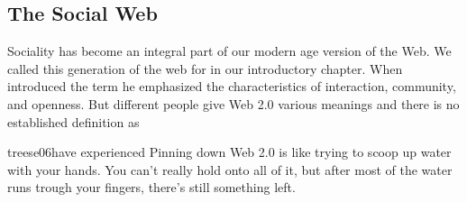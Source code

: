 \subsection{The Social Web}
\label{section:background.sociality.the.social.web}

Sociality has become an integral part of our modern age version of the Web.
We called this generation of the web for %
in our introductory chapter. When \citet{oreilly05} introduced the term he
emphasized the characteristics of interaction, community, and openness.
But different people give Web 2.0 various meanings and there is no
established definition as
\begin{fullquote}[p.~15]{treese06}{have experienced}
  Pinning down Web 2.0 is like trying to scoop up water with your hands. You
  can't really hold onto all of it, but after most of the water runs trough
  your fingers, there's still something left.
\end{fullquote}

